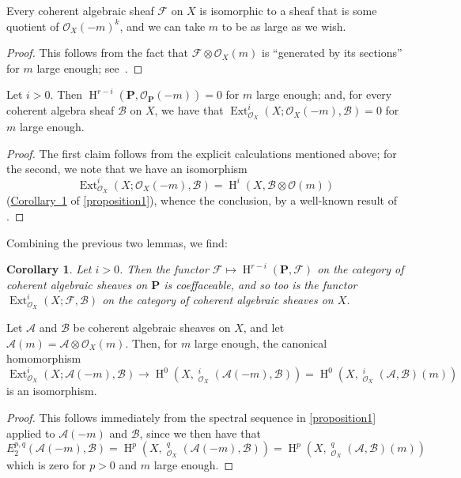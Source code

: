 \documentclass{article}
\theoremstyle{plain}
\newenvironment{lemma}[1]
    {\renewcommand\theinnercustomlemma{#1}\innercustomlemma}
    {\endinnercustomlemma}
\newtheorem*{corollary*}{Corollary}
\theoremstyle{definition}
\newcommand{\sh}{\mathscr}
\newcommand{\bb}{\mathbf}
\DeclareMathOperator{\Ext}{Ext}
\DeclareMathOperator{\shExt}{\underline{Ext}}
\DeclareMathOperator{\HH}{H}
\newcommand{\oldpage}[1]{\marginpar{\footnotesize$\Big\vert$ \textit{p.~#1}}}
\begin{document}
\begin{lemma}{3}
\label{lemma3}
  Every coherent algebraic sheaf $\sh{F}$ on $X$ is isomorphic to a sheaf that is some quotient of $\sh{O}_X(-m)^k$, and we can take $m$ to be as large as we wish.
\end{lemma}

\begin{proof}
  This follows from the fact that $\sh{F}\otimes\sh{O}_X(m)$ is ``generated by its sections'' for $m$ large enough; see~\cite{3}.
\end{proof}

\begin{lemma}{4}
\label{lemma4}
  Let $i>0$.
  Then $\HH^{r-i}(\bb{P},\sh{O}_\bb{P}(-m))=0$ for $m$ large enough;
  and, for every coherent algebra sheaf $\sh{B}$ on $X$, we have that $\Ext_{\sh{O}_X}^i(X;\sh{O}_X(-m),\sh{B})=0$ for $m$ large enough.
\end{lemma}

\begin{proof}
  The first claim follows from the explicit calculations mentioned above;
  for the second, we note that we have an isomorphism
  \[
    \Ext_{\sh{O}_X}^i(X;\sh{O}_X(-m),\sh{B}) = \HH^i(X,\sh{B}\otimes\sh{O}(m))
  \]
  (\hyperref[proposition1corollary1]{Corollary~1} of \cref{proposition1}), whence the conclusion, by a well-known result of \cite{3}.
\end{proof}

Combining the previous two lemmas, we find:

\begin{corollary*}
\label{lemma3andlemma4corollary}
  Let $i>0$.
  Then the functor $\sh{F}\mapsto\HH^{r-i}(\bb{P},\sh{F})$ on the category of coherent algebraic sheaves on $\bb{P}$ is coeffaceable, and so too is the functor $\Ext_{\sh{O}_X}^i(X;\sh{F},\sh{B})$ on the category of coherent algebraic sheaves on $X$.
\end{corollary*}

\oldpage{149-16}
\begin{lemma}{5}
\label{lemma5}
  Let $\sh{A}$ and $\sh{B}$ be coherent algebraic sheaves on $X$, and let $\sh{A}(m)=\sh{A}\otimes\sh{O}_X(m)$.
  Then, for $m$ large enough, the canonical homomorphism
  \[
    \Ext_{\sh{O}_X}^i(X;\sh{A}(-m),\sh{B})
    \to \HH^0(X,\shExt_{\sh{O}_X}^i(\sh{A}(-m),\sh{B}))
    = \HH^0(X,\shExt_{\sh{O}_X}^i(\sh{A},\sh{B})(m))
  \]
  is an isomorphism.
\end{lemma}

\begin{proof}
  This follows immediately from the spectral sequence in \cref{proposition1} applied to $\sh{A}(-m)$ and $\sh{B}$, since we then have that
  \[
    E_2^{p,q}(\sh{A}(-m),\sh{B})
    = \HH^p(X,\shExt_{\sh{O}_X}^q(\sh{A}(-m),\sh{B}))
    = \HH^p(X,\shExt_{\sh{O}_X}^q(\sh{A},\sh{B})(m))
  \]
  which is zero for $p>0$ and $m$ large enough.
\end{proof}
\end{document}
